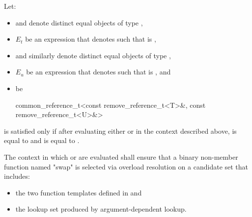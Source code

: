 \begin{itemdescr}
\pnum
Let:
\begin{itemize}
\item {} and  denote distinct equal objects of type
  ,
\item $E_t$ be an expression that denotes  such that
   is ,
\item {} and  similarly denote distinct equal objects of type
  ,
\item $E_u$ be an expression that denotes  such that
   is , and
\item {} be
  \begin{codeblock}
    common_reference_t<const remove_reference_t<T>&, const remove_reference_t<U>&>
  \end{codeblock}
\end{itemize}
 is satisfied only if after evaluating
either  or  in the context
described above,  is equal to  and  is
equal to .

\pnum
The context in which  or 
are evaluated shall ensure that a binary non-member function named "swap" is
selected via overload resolution on a candidate set that
includes:
\begin{itemize}
\item the two  function templates defined in
   and
\item the lookup set produced by argument-dependent
  lookup.
\end{itemize}
\end{itemdescr}

